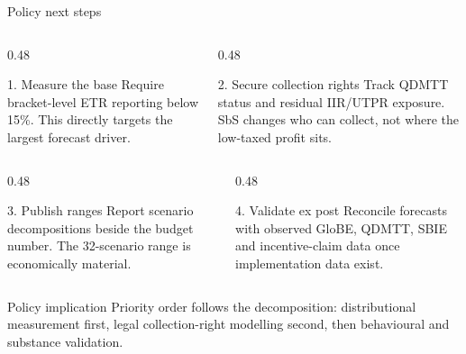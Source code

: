\documentclass[aspectratio=169, 11pt]{beamer}
\begin{document}
\begin{frame}{Policy next steps}
\footnotesize
\begin{columns}[T]
\begin{column}{0.48\textwidth}
\begin{block}{1. Measure the base}
  Require bracket-level ETR reporting below 15\%. This directly targets the largest forecast driver.
\end{block}
\end{column}
\begin{column}{0.48\textwidth}
\begin{exampleblock}{2. Secure collection rights}
  Track QDMTT status and residual IIR/UTPR exposure. SbS changes who can collect, not where the low-taxed profit sits.
\end{exampleblock}
\end{column}
\end{columns}

\vspace{0.35em}
\begin{columns}[T]
\begin{column}{0.48\textwidth}
\begin{block}{3. Publish ranges}
  Report scenario decompositions beside the budget number. The 32-scenario range is economically material.
\end{block}
\end{column}
\begin{column}{0.48\textwidth}
\begin{alertblock}{4. Validate ex post}
  Reconcile forecasts with observed GloBE, QDMTT, SBIE and incentive-claim data once implementation data exist.
\end{alertblock}
\end{column}
\end{columns}

\vspace{0.45em}
\begin{block}{Policy implication}
  Priority order follows the decomposition: distributional measurement first, legal collection-right modelling second, then behavioural and substance validation.
\end{block}
\end{frame}
\end{document}
